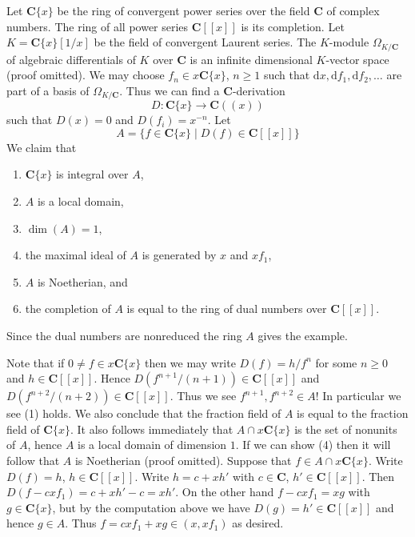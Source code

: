 \medskip\noindent
Let $\mathbf{C}\{x\}$ be the ring of convergent power series over
the field $\mathbf{C}$ of complex numbers. The ring of all power series
$\mathbf{C}[[x]]$ is its completion. Let $K = \mathbf{C}\{x\}[1/x]$
be the field of convergent Laurent series. The $K$-module
$\Omega_{K/\mathbf{C}}$ of algebraic differentials
of $K$ over $\mathbf{C}$ is an infinite dimensional $K$-vector space
(proof omitted). We may choose $f_n \in x\mathbf{C}\{x\}$,
$n \geq 1$ such that
$
\text{d}x, \text{d}f_1, \text{d}f_2, \ldots
$
are part of a basis of $\Omega_{K/\mathbf{C}}$. Thus we can
find a $\mathbf{C}$-derivation
$$
D : \mathbf{C}\{x\} \longrightarrow \mathbf{C}((x))
$$
such that $D(x) = 0$ and $D(f_i) = x^{-n}$. Let
$$
A = \{f \in \mathbf{C}\{x\} \mid D(f) \in \mathbf{C}[[x]]\}
$$
We claim that
\begin{enumerate}
\item $\mathbf{C}\{x\}$ is integral over $A$,
\item $A$ is a local domain,
\item $\dim(A) = 1$,
\item the maximal ideal of $A$ is generated by $x$ and $xf_1$,
\item $A$ is Noetherian, and
\item the completion of $A$ is equal to the ring of dual numbers
over $\mathbf{C}[[x]]$.
\end{enumerate}
Since the dual numbers are nonreduced the ring $A$ gives the example.

\medskip\noindent
Note that if $0 \not = f \in x\mathbf{C}\{x\}$ then
we may write $D(f) = h/f^n$ for some $n \geq 0$ and $h \in \mathbf{C}[[x]]$.
Hence $D(f^{n + 1}/(n + 1)) \in \mathbf{C}[[x]]$
and $D(f^{n + 2}/(n + 2)) \in \mathbf{C}[[x]]$. Thus we
see $f^{n + 1}, f^{n + 2} \in A$!
In particular we see (1) holds. We also conclude that
the fraction field of $A$ is equal to the fraction field of
$\mathbf{C}\{x\}$. It also follows immediately that
$A \cap x\mathbf{C}\{x\}$ is the set of nonunits of $A$, hence
$A$ is a local domain of dimension $1$. If we can show (4)
then it will follow that $A$ is Noetherian (proof omitted).
Suppose that $f \in A \cap x\mathbf{C}\{x\}$. Write
$D(f) = h$, $h \in \mathbf{C}[[x]]$. Write $h = c + xh'$
with $c \in \mathbf{C}$, $h' \in \mathbf{C}[[x]]$. Then
$D(f - cxf_1) = c + xh' - c = xh'$. On the other hand
$f - cxf_1 = xg$ with $g \in \mathbf{C}\{x\}$, but by the
computation above we have $D(g) = h' \in \mathbf{C}[[x]]$
and hence $g \in A$. Thus $f = cxf_1 + xg \in (x, xf_1)$ as desired.

